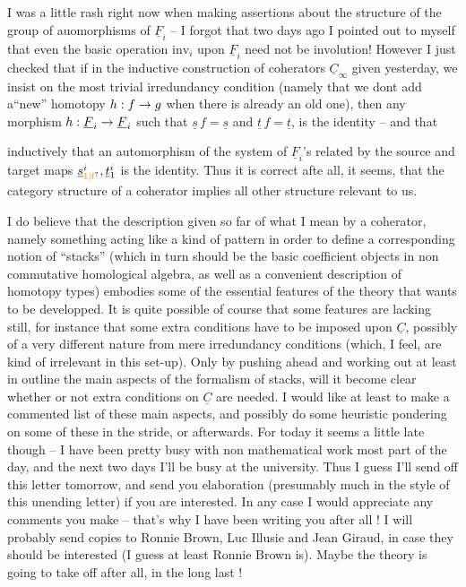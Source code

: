 I was a little rash right now when making assertions about the structure of the group of auomorphisms of $\underline{F}_i$ -- I forgot that two days ago I pointed out to myself that even the basic operation $\mathrm{inv}_i$ upon $\underline{F}_i$ need not  be  involution!
However I just checked that if in the inductive construction of coherators $\underline{C}_{\infty}$ given yesterday, we insist on the most trivial irredundancy condition \deleted{\unsure{--}}(namely that we dont add a``new'' homotopy $h:f\to g$ when there is already an old one), then any morphism $h:\underline{F}_i\to\underline{F}_i$ such that $\underline{s}\,f=\underline{s}$ and $\underline{t}\,f=\underline{t}$, is the identity -- and that


 inductively that an automorphism of the system of $\underline{F}_i$'s related by the source and target maps $\underline{s}_{\unsure{1|l}}^i,\underline{t}_1^i$ is the identity. Thus it is correct afte all, it seems, that the category structure of a coherator implies all other structure relevant to us.

I do believe that the description given so far of what I mean by a coherator,  namely something acting like a kind of pattern in order to define a corresponding notion of ``stacks'' (which in turn should be the basic coefficient objects in non commutative homological algebra, as well as a convenient description of homotopy types) embodies some of the essential features of the theory that wants to be developped. It is quite possible of course that some features are lacking still, for instance that some extra conditions have to be imposed upon $\underline{C}$, possibly of a very different nature from mere irredundancy conditions (which, I feel, are kind of irrelevant in this set-up). Only by pushing ahead and working out at least in outline the main aspects of the formalism of stacks, will it become clear whether or not extra conditions on $\underline{C}$ are needed. I would like at least to make a commented list of these main aspects, and possibly do some heuristic pondering on some of these in the stride, or afterwards. For today it seems a little late though -- I have been pretty busy with non mathematical work most part of the day, and the next two days I'll be busy at the university. Thus I guess I'll send off this letter tomorrow, and send you  elaboration (presumably much in the style of this unending letter) if you are interested. In any case I would appreciate any comments you make -- that's why I have been writing you after all ! I will probably send copies to Ronnie Brown, Luc Illusie and Jean Giraud, in case they should be interested (I guess at least Ronnie Brown is). Maybe the theory is going to take off after all, in the long last !


